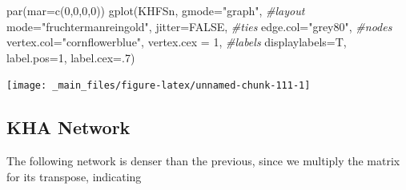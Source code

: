 \documentclass[
  notitlepage,
  onecolumn,
  openany]{book}
\newenvironment{Shaded}{\begin{snugshade}}{\end{snugshade}}
\newcommand{\AttributeTok}[1]{\textcolor[rgb]{0.77,0.63,0.00}{#1}}
\newcommand{\CommentTok}[1]{\textcolor[rgb]{0.56,0.35,0.01}{\textit{#1}}}
\newcommand{\ConstantTok}[1]{\textcolor[rgb]{0.00,0.00,0.00}{#1}}
\newcommand{\DecValTok}[1]{\textcolor[rgb]{0.00,0.00,0.81}{#1}}
\newcommand{\FunctionTok}[1]{\textcolor[rgb]{0.00,0.00,0.00}{#1}}
\newcommand{\NormalTok}[1]{#1}
\newcommand{\StringTok}[1]{\textcolor[rgb]{0.31,0.60,0.02}{#1}}
\begin{document}
\begin{Shaded}
\begin{Highlighting}[]
\FunctionTok{par}\NormalTok{(}\AttributeTok{mar=}\FunctionTok{c}\NormalTok{(}\DecValTok{0}\NormalTok{,}\DecValTok{0}\NormalTok{,}\DecValTok{0}\NormalTok{,}\DecValTok{0}\NormalTok{))}
\FunctionTok{gplot}\NormalTok{(KHFSn, }
      \AttributeTok{gmode=}\StringTok{"graph"}\NormalTok{,}
      \CommentTok{\#layout}
      \AttributeTok{mode=}\StringTok{"fruchtermanreingold"}\NormalTok{,}
      \AttributeTok{jitter=}\ConstantTok{FALSE}\NormalTok{,}
      \CommentTok{\#ties}
      \AttributeTok{edge.col=}\StringTok{"grey80"}\NormalTok{,}
      \CommentTok{\#nodes}
      \AttributeTok{vertex.col=}\StringTok{"cornflowerblue"}\NormalTok{,}
      \AttributeTok{vertex.cex =} \DecValTok{1}\NormalTok{,}
      \CommentTok{\#labels}
      \AttributeTok{displaylabels=}\NormalTok{T,}
      \AttributeTok{label.pos=}\DecValTok{1}\NormalTok{,}
      \AttributeTok{label.cex=}\NormalTok{.}\DecValTok{7}\NormalTok{)}
\end{Highlighting}
\end{Shaded}

\begin{center}\texttt{[image: \_main\_files/figure-latex/unnamed-chunk-111-1]} \end{center}

\hypertarget{kha-network}{%
\subsection{KHA Network}\label{kha-network}}

The following network is denser than the previous, since we multiply the matrix for its transpose, indicating
\end{document}
